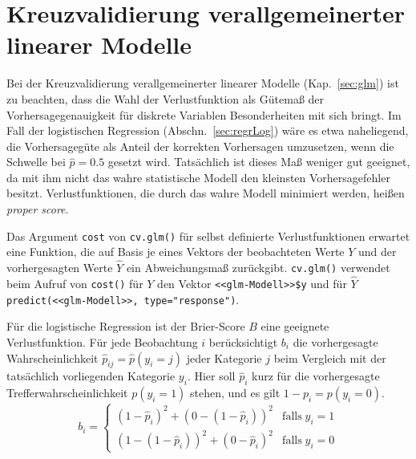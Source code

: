 \section{Kreuzvalidierung verallgemeinerter linearer Modelle}
\label{sec:glmCV}

Bei der Kreuzvalidierung verallgemeinerter linearer Modelle (Kap.\ \ref{sec:glm}) ist zu beachten, dass die Wahl der Verlustfunktion als Gütemaß der Vorhersagegenauigkeit für diskrete Variablen Besonderheiten mit sich bringt. Im Fall der logistischen Regression (Abschn.\ \ref{sec:regrLog}) wäre es etwa naheliegend, die Vorhersagegüte als Anteil der korrekten Vorhersagen umzusetzen, wenn die Schwelle bei $\hat{p} = 0.5$ gesetzt wird. Tatsächlich ist dieses Maß weniger gut geeignet, da mit ihm nicht das wahre statistische Modell den kleinsten Vorhersagefehler besitzt. Verlustfunktionen, die durch das wahre Modell minimiert werden, heißen \emph{proper score}.

Das Argument \lstinline!cost! von \lstinline!cv.glm()! für selbst definierte Verlustfunktionen erwartet eine Funktion, die auf Basis je eines Vektors der beobachteten Werte $Y$ und der vorhergesagten Werte $\hat{Y}$ ein Abweichungsmaß zurückgibt. \lstinline!cv.glm()! verwendet beim Aufruf von \lstinline!cost()! für $Y$ den Vektor \lstinline!<<glm-Modell>>$y! und für $\hat{Y}$ \lstinline!predict(<<glm-Modell>>, type="response")!.

Für die logistische Regression ist der Brier-Score $B$ eine geeignete Verlustfunktion. Für jede Beobachtung $i$ berücksichtigt $b_{i}$ die vorhergesagte Wahrscheinlichkeit $\hat{p}_{ij} = \hat{p}(y_{i} = j)$ jeder Kategorie $j$ beim Vergleich mit der tatsächlich vorliegenden Kategorie $y_{i}$. Hier soll $\hat{p}_{i}$ kurz für die vorhergesagte Trefferwahrscheinlichkeit $p(y_{i} = 1)$ stehen, und es gilt $1-p_{i} = p(y_{i} = 0)$.
\begin{equation*}
b_{i} = \left\{\begin{array}{ll}
  (1-\hat{p}_{i})^{2} + (0 - (1-\hat{p}_{i}))^{2} & \text{falls} \; y_{i} = 1\\[1ex]
  (1-(1-\hat{p}_{i}))^{2} + (0 - \hat{p}_{i})^{2} & \text{falls} \; y_{i} = 0
\end{array}\right.
\end{equation*}

